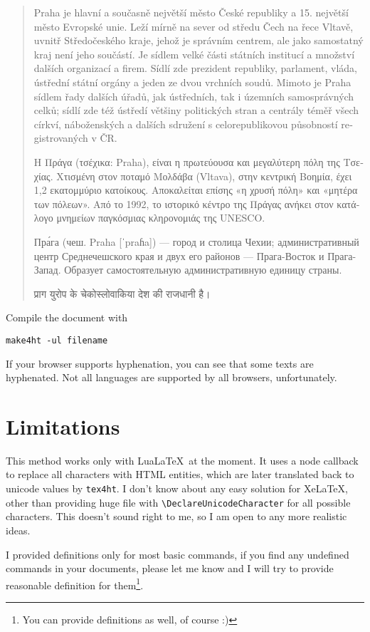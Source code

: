 \documentclass{article}
\begin{document}
\begin{quotation}
\begin{czech}
Praha je hlavní a současně největší město České republiky a 15. největší město
Evropské unie. Leží mírně na sever od středu Čech na řece Vltavě, uvnitř
Středočeského kraje, jehož je správním centrem, ale jako samostatný kraj není
jeho součástí. Je sídlem velké části státních institucí a množství dalších
organizací a firem. Sídlí zde prezident republiky, parlament, vláda, ústřední
státní orgány a jeden ze dvou vrchních soudů. Mimoto je Praha sídlem řady
dalších úřadů, jak ústředních, tak i územních samosprávných celků; sídlí zde
též ústředí většiny politických stran a centrály téměř všech církví,
náboženských a dalších sdružení s celorepublikovou působností registrovaných v
ČR.  
\end{czech}

\textgreek{Η Πράγα (τσέχικα: Praha), είναι η πρωτεύουσα και μεγαλύτερη πόλη της
  Τσεχίας. Χτισμένη στον ποταμό Μολδάβα (Vltava), στην κεντρική Βοημία, έχει
  1,2 εκατομμύριο κατοίκους. Αποκαλείται επίσης «η χρυσή πόλη» και «μητέρα των
  πόλεων». Από το 1992, το ιστορικό κέντρο της Πράγας ανήκει στον κατάλογο
  μνημείων παγκόσμιας κληρονομιάς της UNESCO.} 

\begin{russian}
Пра́га (чеш. Praha [ˈpraɦa]) — город и столица Чехии; административный центр Среднечешского края и двух его районов — Прага-Восток и Прага-Запад. Образует самостоятельную административную единицу страны.
\end{russian}

\begin{hindi}
  प्राग युरोप के चेकोस्लोवाकिया देश की राजधानी है।
\end{hindi}
\end{quotation}

Compile the document with 

\begin{verbatim}
make4ht -ul filename 
\end{verbatim}

If your browser supports hyphenation, you can see that some texts are hyphenated. Not all languages are supported by all browsers, unfortunately.

\section{Limitations}

This method works only with Lua\LaTeX\ at the moment. It uses a node callback to
replace all characters with HTML entities, which are later translated back to
unicode values by \texttt{tex4ht}. I don't know about any easy solution for
Xe\LaTeX, other than providing huge file with \verb|\DeclareUnicodeCharacter| for all possible characters. This doesn't sound right to me, so I am open to any more realistic ideas.

I provided definitions only for most basic commands, if you find any undefined
commands in your documents, please let me know and I will try to provide reasonable definition for them\footnote{You can provide definitions as well, of course :)}.
\end{document}
